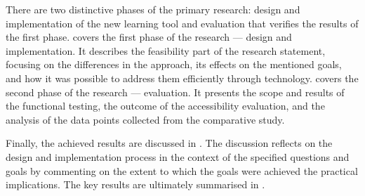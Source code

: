 There are two distinctive phases of the primary research: design and implementation of the new learning tool and evaluation that verifies the results of the first phase.
 covers the first phase of the research --- design and implementation.
It describes the feasibility part of the research statement, focusing on the differences in the approach, its effects on the mentioned goals, and how it was possible to address them efficiently through technology.
 covers the second phase of the research --- evaluation.
It presents the scope and results of the functional testing, the outcome of the accessibility evaluation, and the analysis of the data points collected from the comparative study.

Finally, the achieved results are discussed in .
The discussion reflects on the design and implementation process in the context of the specified questions and goals by commenting on the extent to which the goals were achieved the practical implications.
The key results are ultimately summarised in .
